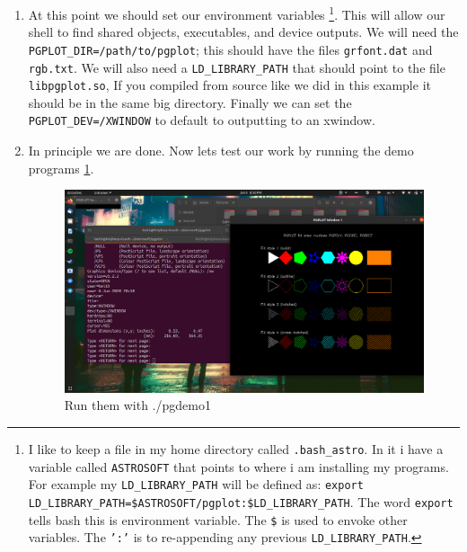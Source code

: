 \documentclass{article}
\begin{document}
\begin{enumerate}
\begin{enumerate}
    			
    			\item At this point we should set our environment variables 
    			\footnote{I like to keep a file in my home directory called \texttt{.bash\_astro}. In it i have a variable called \texttt{ASTROSOFT} that points to where i am installing my programs. For example my \texttt{LD\_LIBRARY\_PATH} will be defined as: \texttt{export LD\_LIBRARY\_PATH=\$ASTROSOFT/pgplot:\$LD\_LIBRARY\_PATH}. The word \texttt{export} tells bash this is environment variable. The \texttt{\$} is used to envoke other variables. The \texttt{':'} is to re-appending any previous \texttt{LD\_LIBRARY\_PATH}.}. 
    			This will allow our shell to find shared objects, executables, and device outputs. We will need the \texttt{PGPLOT\_DIR=/path/to/pgplot}; this should have the files \texttt{grfont.dat} and \texttt{rgb.txt}. We will also need a \texttt{LD\_LIBRARY\_PATH} that should point to the file \texttt{libpgplot.so}, If you compiled from source like we did in this example it should be in the same big directory. Finally we can set the \texttt{PGPLOT\_DEV=/XWINDOW} to default to outputting to an xwindow. 
    			
    			\item In principle we are done. Now lets test our work by running the demo programs \ref{fig:sucesfful-pgplot-install}.  
    			\begin{figure}[h]
    				\includegraphics[width=\linewidth]{Images/sucesfful-pgplot-install.png}
    				\caption{Run them with ./pgdemo1}
    				\label{fig:sucesfful-pgplot-install}  			
    			\end{figure}
    	
    		\end{enumerate}
    		
    		
    	\end{enumerate}
    	


    	
\end{document}
